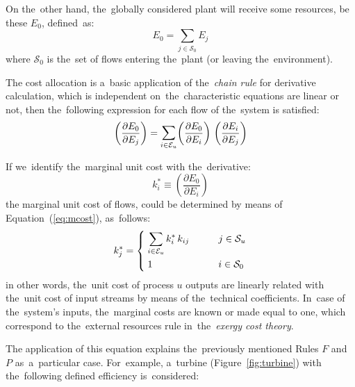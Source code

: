 \documentclass[energies,article,accept,moreauthors,pdftex]{Definitions/mdpi}
\newcommand{\dpartial}[2]{\left(\dfrac{\partial E_{#1}}{\partial E_{#2}}\right)}
\newcommand{\bsum}{\mathlarger{\sum}}
\begin{document}
On the~other hand, the~globally considered plant will receive some resources, be these $E_0$, defined~as:
\begin{equation}
E_0=\sum_{j\in\mathcal{S}_0}{E_j}
\end{equation}
where $\mathcal{S}_0$ is the~set of flows entering the~plant (or leaving the~environment).

The cost allocation is a~basic application of the~\emph{chain rule} for derivative calculation, which is independent on~the~characteristic equations are linear or not, then the~following expression for each flow of the~system is satisfied:
\begin{equation}
\dpartial{0}{j}=\bsum_{i\in\mathcal{E}_u}{\dpartial{0}{i}\,\dpartial{i}{j}}
\label{eq:mcost}
\end{equation}

If we~identify the~marginal unit cost with the~derivative:
\begin{equation}
k_i^*\equiv\dpartial{0}{i}
\end{equation}
the marginal unit cost of flows, could be determined by means of Equation~(\ref{eq:mcost}), as~follows:
\begin{equation}
    k_j^*=\begin{dcases}
    \;\sum\limits_{i\in\mathcal{E}_u}{k_i^*\,k_{ij}} \qquad &j\in\mathcal{S}_u \\
    \;1 \qquad &i\in\mathcal{S}_0
    \end{dcases}
    \label{eq:kchar}
\end{equation}
in other words, the~unit cost of process $u$ outputs are linearly related with the~unit cost of input streams by means of the~technical coefficients. In~case of the~system's inputs, the~marginal costs are known or made equal to one, which correspond to the~external resources rule in~the~\emph{exergy cost theory}.

The application of this equation explains the~previously mentioned Rules $F$ and $P$ as~a~particular case. For~example, a~turbine (Figure~\ref{fig:turbine}) with the~following defined efficiency is~considered:
\end{document}
